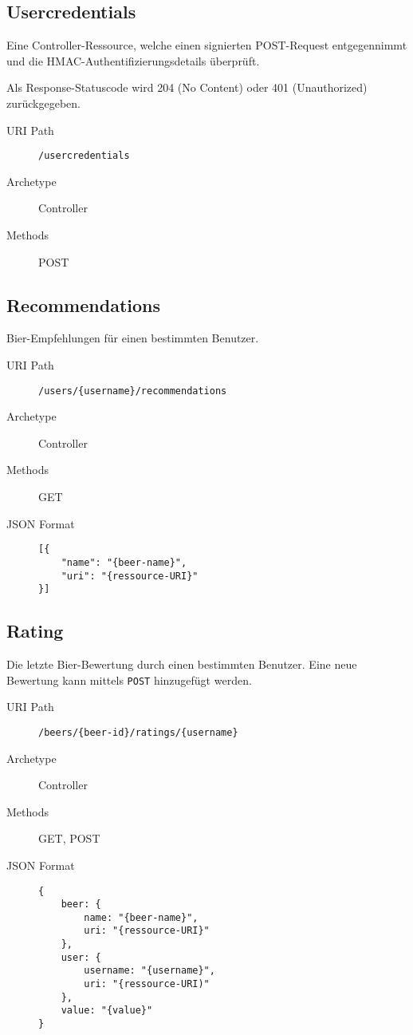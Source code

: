 \documentclass[10pt,a4paper]{scrartcl}
\begin{document}
\subsection{Usercredentials}

Eine Controller-Ressource, welche einen signierten POST-Request entgegennimmt und die
HMAC-Authentifizierungsdetails überprüft.

Als Response-Statuscode wird 204 (No Content) oder 401 (Unauthorized) zurückgegeben.

\begin{description}
	\item[URI Path] \texttt{/usercredentials}
	\item[Archetype] Controller
	\item[Methods] POST
\end{description}


\subsection{Recommendations}

Bier-Empfehlungen für einen bestimmten Benutzer.

\begin{description}
	\item[URI Path] \texttt{/users/\{username\}/recommendations}
	\item[Archetype] Controller
	\item[Methods] GET
	\item[JSON Format] \hfill
\begin{lstlisting}
[{
	"name": "{beer-name}",
	"uri": "{ressource-URI}"
}]
\end{lstlisting}
\end{description}


\subsection{Rating}

Die letzte Bier-Bewertung durch einen bestimmten Benutzer. Eine neue Bewertung kann mittels \texttt{POST} hinzugefügt werden.

\begin{description}
	\item[URI Path] \texttt{/beers/\{beer-id\}/ratings/\{username\}}
	\item[Archetype] Controller
	\item[Methods] GET, POST
	\item[JSON Format] \hfill
\begin{lstlisting}
{
	beer: {
		name: "{beer-name}",
		uri: "{ressource-URI}"
	},
	user: {
		username: "{username}",
		uri: "{ressource-URI)"
	},
	value: "{value}"
}
	\end{lstlisting}
\end{description}
\end{document}
